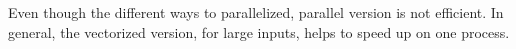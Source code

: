 \documentclass{article}
\begin{document}
\vspace{2ex}
Even though the different ways to parallelized, parallel version is not efficient.  
In general, the vectorized version, for large inputs, helps to speed up on one process.



\end{document}
